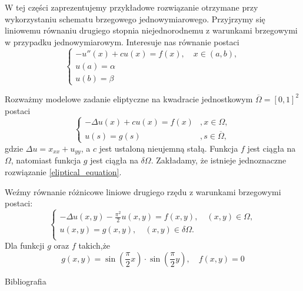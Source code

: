 \documentclass[notheorems]{beamer}
\begin{document}
\begin{frame}
W tej części zaprezentujemy przykładowe rozwiązanie otrzymane przy wykorzystaniu schematu brzegowego jednowymiarowego. Przyjrzymy się liniowemu równaniu drugiego stopnia niejednorodnemu z warunkami brzegowymi w przypadku jednowymiarowym. Interesuje nas równanie postaci
$$
\left\lbrace
\begin{array}{c}
-u''(x) + c u(x) = f(x), \quad x \in (a,b), \\
u(a) = \alpha \\
u(b) = \beta
\end{array}
\right.
$$
\end{frame}
\begin{frame}
\begin{problem}
Rozważmy modelowe zadanie eliptyczne na kwadracie jednostkowym $ \overline{\Omega} = [0,1]^2 $ postaci 
\begin{equation} \label{eliptical_equation}
\left\{ \begin{array}{ll}
-\Delta u(x) + cu(x) = f(x) &, x \in \Omega,\\
u(s) = g(s) &, s \in \overline{\Omega},
\end{array} \right.
\end{equation}
gdzie $\Delta u = x_{xx} + u_{yy}$, a $c$ jest ustaloną nieujemną stałą. Funkcja $f$ jest ciągła na $\Omega$, natomiast funkcja $g$ jest ciągła na $\delta \Omega$. Zakładamy, że istnieje jednoznaczne rozwiązanie \eqref{eliptical_equation}.
\end{problem}
\end{frame}
\begin{frame}
\begin{example}
Weźmy równanie różnicowe liniowe drugiego rzędu z warunkami brzegowymi postaci:
$$
\left\lbrace
\begin{array}{c}
-\Delta u(x,y) - \frac{\pi^2}{2}u(x,y) = f(x,y), \quad (x,y) \in \Omega, \\
u(x,y) = g(x,y), \quad (x,y) \in \delta \Omega.\\
\end{array}
\right.
$$
Dla funkcji $g$ oraz $f$ takich,że
$$
g(x,y) = \sin(\frac{\pi}{2}x) \cdot \sin(\frac{\pi}{2}y), \quad f(x,y)=0
$$
\end{example}
\end{frame}
\begin{frame}{Bibliografia}



\end{frame}
\end{document}

